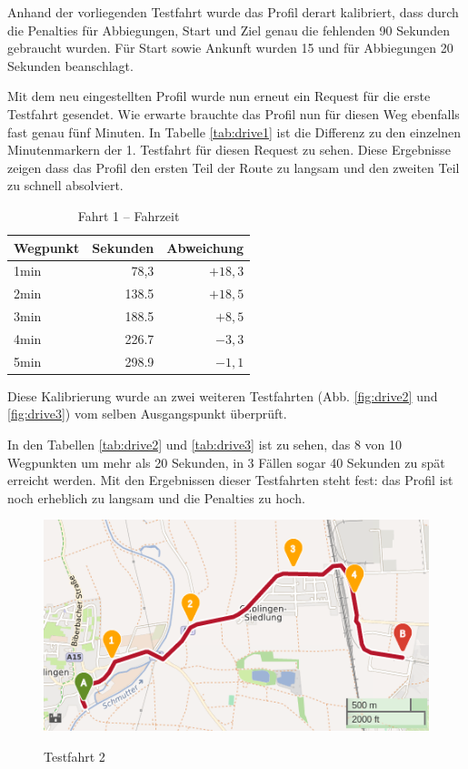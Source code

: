 \documentclass[12pt,a4paper]{article}
\begin{document}
Anhand der vorliegenden Testfahrt wurde das Profil derart kalibriert, dass durch die Penalties für Abbiegungen, Start und Ziel genau die fehlenden 90 Sekunden gebraucht wurden.
Für Start sowie Ankunft wurden 15 und für Abbiegungen 20 Sekunden beanschlagt.

Mit dem neu eingestellten Profil wurde nun erneut ein Request für die erste Testfahrt gesendet. Wie erwarte brauchte das Profil nun für diesen Weg ebenfalls fast genau fünf Minuten.
In Tabelle \ref{tab:drive1} ist die Differenz zu den einzelnen Minutenmarkern der 1. Testfahrt für diesen Request zu sehen. Diese Ergebnisse zeigen dass das Profil den ersten Teil der Route zu langsam und den zweiten Teil zu schnell absolviert.

\begin{table}[h]
\centering
\caption{Fahrt 1 -- Fahrzeit}
\label{tab:drive11}
\begin{tabular}{|l|r|r|}
\hline
Wegpunkt & Sekunden & Abweichung \\ \hline 
1min & 78,3 & $+18,3$ \\
2min & 138.5 & $+18,5$ \\
3min & 188.5 & $+8,5$ \\
4min & 226.7 & $-3,3$ \\
5min & 298.9 & $-1,1$ \\
\hline
\end{tabular}
\end{table}

Diese Kalibrierung wurde an zwei weiteren Testfahrten (Abb. \ref{fig:drive2} und \ref{fig:drive3}) vom selben Ausgangspunkt überprüft.

In den Tabellen \ref{tab:drive2} und \ref{tab:drive3} ist zu sehen, das 8 von 10 Wegpunkten um mehr als 20 Sekunden, in 3 Fällen sogar 40 Sekunden zu spät erreicht werden.
Mit den Ergebnissen dieser Testfahrten steht fest: das Profil ist noch erheblich zu langsam und die Penalties zu hoch.

\begin{figure}[h]
\centering
\caption{Testfahrt 2}
\label{drive2}
\includegraphics[width = 0.70 \textwidth]{../media/Fahrt2crop.png} \\
\end{figure}
\end{document}
